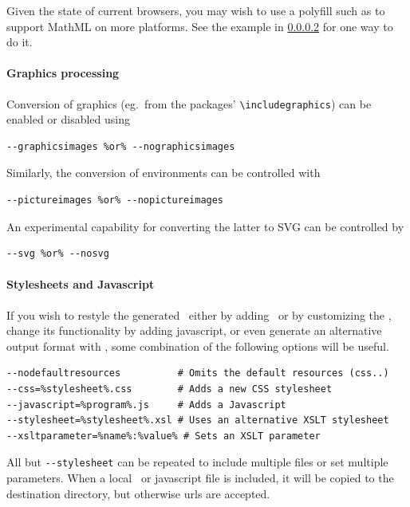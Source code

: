 \documentclass{book}
\newcommand{\shellcode}{\lstinline[style=shell]}
\begin{document}
Given the state of current browsers, you may wish
to use a polyfill such as  
to support MathML on more platforms.
See the example in \ref{usage.post.xslt} for one way to do it.

\paragraph[Graphics]{Graphics processing}\label{usage.post.graphics}
Conversion of graphics (eg.~from the  packages' 
\verb|\includegraphics|) can be enabled or disabled
using
\begin{lstlisting}[style=shell]
--graphicsimages %or% --nographicsimages
\end{lstlisting}
Similarly, the conversion of  environments can be controlled with
\begin{lstlisting}[style=shell]
--pictureimages %or% --nopictureimages
\end{lstlisting}
An experimental capability for converting the latter to \textsc{SVG} can be
controlled by
\begin{lstlisting}[style=shell]
--svg %or% --nosvg
\end{lstlisting}

\paragraph{Stylesheets and Javascript}\label{usage.post.xslt}
If you wish to restyle the generated \HTML\ either by adding \CSS\ or by customizing
the \XSLT, change its functionality by adding javascript,
or even generate an alternative output format with \XSLT,
some combination of the following options will be useful.
\begin{lstlisting}[style=shell]
--nodefaultresources          # Omits the default resources (css..)
--css=%stylesheet%.css        # Adds a new CSS stylesheet
--javascript=%program%.js     # Adds a Javascript
--stylesheet=%stylesheet%.xsl # Uses an alternative XSLT stylesheet
--xsltparameter=%name%:%value% # Sets an XSLT parameter
\end{lstlisting}
All but \shellcode{--stylesheet} can be repeated to include multiple files
or set multiple parameters.  When a local \CSS\ or javascript file is included,
it will be copied to the destination directory, but otherwise urls are accepted.
\end{document}
